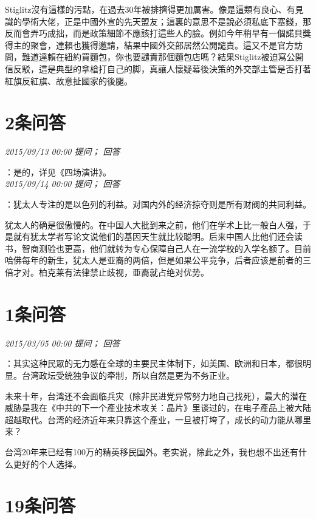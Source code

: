 \documentclass[twocolumn]{ctexart}
\begin{document}
Stiglitz沒有這樣的污點，在過去30年被排擠得更加厲害。像是這類有良心、有見識的學術大佬，正是中國外宣的先天盟友；這裏的意思不是說必須私底下塞錢，那反而會弄巧成拙，而是政策細節不應該打這些人的臉。例如今年稍早有一個諾貝獎得主的聚會，達賴也獲得邀請，結果中國外交部居然公開譴責。這又不是官方訪問，難道達賴在紐約買麵包，你也要譴責那個麵包店嗎？結果Stiglitz被迫寫公開信反駁，這是典型的拿槍打自己的脚，真讓人懷疑幕後決策的外交部主管是否打著紅旗反紅旗、故意扯國家的後腿。
\\

\section{2条问答}

\textit{\hfill\noindent\small 2015/09/13 00:00 提问； 回答}

：是的，详见《四场演讲》。\\

\textit{\hfill\noindent\small 2015/09/14 00:00 提问； 回答}

：犹太人专注的是以色列的利益。对国内外的经济掠夺则是所有财阀的共同利益。

犹太人的确是很傲慢的。在中国人大批到来之前，他们在学术上比一般白人强，于是就有犹太学者写论文说他们的基因天生就比较聪明。后来中国人比他们还会读书，智商测验也更高，他们就转为专心保障自己人在一流学校的入学名额了。目前哈佛每年的新生，犹太人是亚裔的两倍，但是如果公平竞争，后者应该是前者的三倍才对。柏克莱有法律禁止歧视，亜裔就占绝对优势。\\

\section{1条问答}

\textit{\hfill\noindent\small 2015/03/05 00:00 提问； 回答}

：其实这种民眾的无力感在全球的主要民主体制下，如美国、欧洲和日本，都很明显。台湾政坛受统独争议的牵制，所以自然是更为不务正业。

未来十年，台湾还不会面临兵灾（除非民进党异常努力地自己找死），最大的潜在威胁是我在《中共的下一个產业技术攻关：晶片》里谈过的，在电子產品上被大陆超越取代。台湾的经济近年来只靠这个產业，一旦被打垮了，成长的动力能从哪里来？

台湾20年来已经有100万的精英移民国外。老实说，除此之外，我也想不出还有什么更好的个人选择。\\

\section{19条问答}
\end{document}
